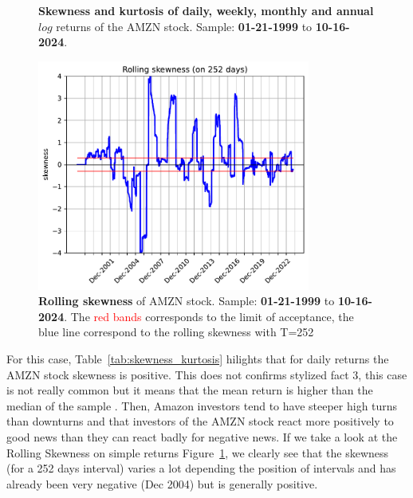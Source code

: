 \documentclass{article}
\begin{document}
\begin{figure}[H]
    \centering
    \begin{minipage}{0.45\textwidth}
        \begin{table}[H]
            \centering
              
            \caption{\textbf{Skewness and kurtosis of daily, weekly, monthly and annual} $log$ returns of the AMZN stock. 
            Sample: \textbf{01-21-1999} to \textbf{10-16-2024}.}
            \label{tab:skewness_kurtosis}
        \end{table}
    \end{minipage}
    \hspace{0.05\textwidth}
    \begin{minipage}{0.45\textwidth}
        \centering
        \includegraphics[width=0.8\textwidth]{Img/Fact3_2_rollskew.pdf}
        \caption{\textbf{Rolling skewness} of AMZN stock. 
        Sample: \textbf{01-21-1999} to \textbf{10-16-2024}. The \textcolor{red}{red bands} corresponds to the limit of acceptance, the blue line correspond to the rolling skewness with T=252}
        \label{fig:Rolling_skewness}
    \end{minipage}
\end{figure}

\noindent For this case, Table~\ref{tab:skewness_kurtosis} hilights that for daily returns the AMZN stock skewness is positive.
This does not confirms stylized fact 3, this case is not really common but it means that the mean return is higher than the median of the sample \cite{albuquerque2012skewness}. 
Then, Amazon investors tend to have steeper high turns than downturns and that investors of the AMZN stock react more positively to good news than they can react badly for negative news.
If we take a look at the Rolling Skewness on simple returns Figure~\ref{fig:Rolling_skewness}, we clearly see that the skewness (for a 252 days interval) varies a lot depending the position of intervals and has already been very negative (Dec 2004) but is generally positive.
\end{document}

